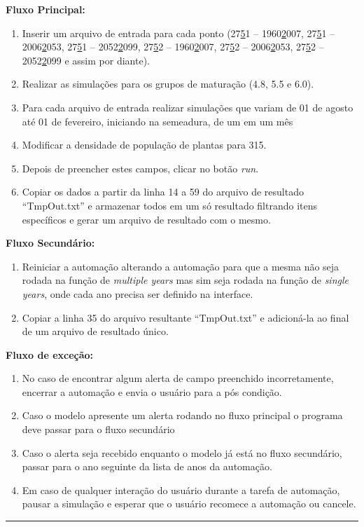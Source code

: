 \documentclass[tg]{mdtufsm}
\begin{document}
            	{\bf Fluxo Principal:}
                	\begin{enumerate}
                		\item Inserir um arquivo de entrada para cada ponto (27\underline51 – 1960\underline2007, 27\underline51 – 2006\underline2053, 27\underline51 – 2052\underline2099, 27\underline52 – 1960\underline2007, 27\underline52 – 2006\underline2053, 27\underline52 – 2052\underline2099 e assim por diante).
                		\item Realizar as simulações para os grupos de maturação (4.8, 5.5 e 6.0).
                		\item Para cada arquivo de entrada realizar simulações que variam de 01 de agosto até 01 de fevereiro, iniciando na semeadura, de um em um mês
                		\item Modificar a densidade de população de plantas para 315.
                		\item Depois de preencher estes campos, clicar no botão \emph{run}.
                		\item Copiar os dados a partir da linha 14 a 59 do arquivo de resultado “TmpOut.txt” e armazenar todos em um só resultado filtrando itens específicos e gerar um arquivo de resultado com o mesmo.
                	\end{enumerate}

            	{\bf Fluxo Secundário:}
                	\begin{enumerate}
                		\item Reiniciar a automação alterando a automação para que a mesma não seja rodada na função de \emph{multiple years} mas sim seja rodada na função de \emph{single years}, onde cada ano precisa ser definido na interface.
                		\item Copiar a linha 35 do arquivo resultante “TmpOut.txt” e adicioná-la ao final de um arquivo de resultado único.
                	\end{enumerate}

            	{\bf Fluxo de exceção:}
                	\begin{enumerate}
                		\item No caso de encontrar algum alerta de campo preenchido incorretamente, encerrar a automação e envia o usuário para a pós condição.
                		\item Caso o modelo apresente um alerta rodando no fluxo principal o programa deve passar para o fluxo secundário
                		\item Caso o alerta seja recebido enquanto o modelo já está no fluxo secundário, passar para o ano seguinte da lista de anos da automação.
                		\item Em caso de qualquer interação do usuário durante a tarefa de automação, pausar a simulação e esperar que o usuário recomece a automação ou cancele.
                	\end{enumerate}
            	\bigskip \hrule
\end{document}
